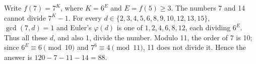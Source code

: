 Write $ f(7)=7^K $, where $ K=6^E $ and $ E=f(5)\ge3 $. The numbers 7 and 14 cannot divide $ 7^K-1 $. For every $ d\in\{2,3,4,5,6,8,9,10,12,13,15\}$, $\gcd(7,d)=1 $ and Euler's $\varphi(d)$ is one of $ 1,2,4,6,8,12 $, each dividing $ 6^E $. Thus all these $ d $, and also 1, divide the number. Modulo 11, the order of 7 is 10; since $ 6^E\equiv6\pmod{10}$ and $ 7^6\equiv4\pmod{11}$, 11 does not divide it. Hence the answer is $ 120-7-11-14=\boxed{88}$.
